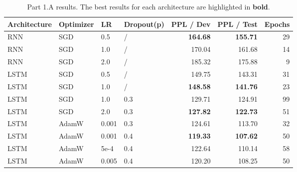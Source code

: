 \documentclass[a4paper]{article}
\begin{document}
\begin{table}[H]
  \centering
  \caption{Part 1.A results. The best results for each architecture are highlighted in \textbf{bold}.}
  \label{tab:final_results_1a}
  \begin{tabular}{llllrrr}
    \toprule
    Architecture & Optimizer & LR & Dropout(p) & PPL / Dev & PPL / Test & Epochs \\
    \midrule
    RNN  & SGD   & 0.5 & /   & \textbf{164.68} & \textbf{155.71} & 29 \\
    RNN  & SGD   & 1.0 & /   & 170.04          & 161.68          & 14 \\
    RNN  & SGD   & 2.0 & /   & 185.32          & 175.88          & 9  \\
    \midrule
    LSTM & SGD   & 0.5 & /   & 149.75          & 143.31          & 31 \\
    LSTM & SGD   & 1.0 & /   & \textbf{148.58} & \textbf{141.76} & 23 \\
    \midrule
    LSTM & SGD   & 1.0 & 0.3 & 129.71          & 124.91          & 99 \\
    LSTM & SGD   & 2.0 & 0.3 & \textbf{127.82} & \textbf{122.73} & 51 \\
    \midrule
    LSTM & AdamW & 0.001 & 0.3 & 124.61       & 113.70          & 32 \\
    LSTM & AdamW & 0.001 & 0.4 & \textbf{119.33} & \textbf{107.62} & 50 \\
    LSTM & AdamW & 5e-4  & 0.4 & 122.64       & 110.14          & 58 \\
    LSTM & AdamW & 0.005 & 0.4 & 120.20       & 108.25          & 50 \\
    \bottomrule
  \end{tabular}
\end{table}

\vspace{6em}
\end{document}

